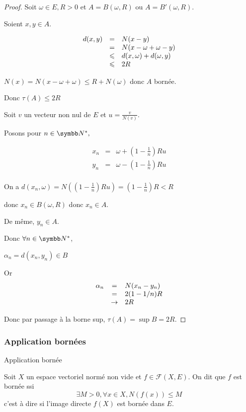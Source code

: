 \begin{proof}
    Soit $\omega \in E, R>0$ et $A = B(\omega, R)$ ou $A = B'(\omega, R)$. 

    Soient $x, y \in A$. 

    \[
    \begin{array}{rcl}
        d(x, y) & = & N(x - y) \\
        \space & = & N(x - \omega + \omega - y) \\
        \space & \leqslant & d(x, \omega) + d(\omega, y) \\
        \space & \leqslant & 2R \\
    \end{array}
    \]

    $N(x) = N(x - \omega + \omega) \leqslant R + N(\omega)$ donc $A$ bornée. 

    Donc $\tau(A) \leqslant 2R$

    Soit $v$ un vecteur non nul de $E$ et $u = \frac v {N(v)}$. 

    Posons pour $n \in \N^*,$

    \[
    \begin{array}{rcl}
        x_n & = & \omega + (1 - \frac 1 n) R u \\
        y_n & = & \omega - ( 1 - \frac 1 n) R u \\
    \end{array}
    \]

    On a $d(x_n, \omega) = N((1 - \frac 1 n)Ru) = ( 1 - \frac 1 n )R < R$

    donc $x_n \in B(\omega, R)$ donc $x_n \in A$. 

    De même, $y_n \in A$.

    Donc $\forall n \in \N^*$, 

    $\alpha_n = d(x_n, y_n) \in B$

    Or 
    \[
    \begin{array}{rcl}
        \alpha_n & = & N(x_n - y_n) \\
        \space & = & 2 (1 - 1 / n) R \\
        \space & \to & 2 R \\
    \end{array}
    \]

    Donc par passage à la borne sup, $\tau(A) = \sup B = 2R$.    
\end{proof}

\subsubsection{Application bornées}
\begin{definition}{Application bornée}{}

    Soit $X$ un espace vectoriel normé non vide et $f \in \mathscr F(X, E)$. 
    On dit que $f$ est bornée ssi
    \[\exists M > 0, \forall x \in X, N(f(x)) \leqslant M\]
    c'est à dire si l'image directe $f(X)$ est bornée dans $E$. 
\end{definition}

